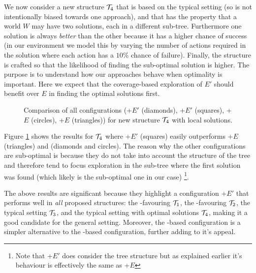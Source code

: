 We now consider a new structure ${\mathcal{T}}_4$ that is based on the typical setting (so is not intentionally biased towards one approach), and that has the property that a world $W$ may have two solutions, each in a different sub-tree. Furthermore one solution is always \textit{better} than the other because it has a higher chance of success (in our environment we model this by varying the number of actions required in the solution where each action has a $10\%$ chance of failure). Finally, the structure is crafted so that the likelihood of finding the sub-optimal solution is higher. The purpose is to understand how our approaches behave when optimality is important. Here we expect that the coverage-based exploration of $E'$ should benefit over $E$ in finding the optimal solutions first. 

\begin{figure}[ht]
\begin{center}

\end{center}
\caption{Comparison of all configurations (\BUL+$E'$ (diamonds), \CL+$E'$ (squares), \BUL+$E$ (circles), \CL+$E$ (triangles)) for new structure ${\mathcal{T}}_4$ with local solutions.}
\label{fig:T4_result}
\end{figure}

Figure \ref{fig:T4_result} shows the results for ${\mathcal{T}}_4$ where \CL+$E'$ (squares) easily outperforms \CL+$E$ (triangles) and \BUL (diamonds and circles). The reason why the other configurations are sub-optimal is because they do not take into account the structure of the tree and therefore tend to focus exploration in the sub-tree where the first solution was found (which likely is the sub-optimal one in our case) \footnote{Note that \BUL+$E'$ does consider the tree structure but as explained earlier it's behaviour is effectively the same as \BUL+$E$}.


The above results are significant because they highlight a configuration \CL+$E'$ that performs well in \textit{all} proposed structures: the \CL-favouring ${\mathcal{T}}_1$, the \BUL-favouring ${\mathcal{T}}_2$, the typical setting ${\mathcal{T}}_3$, and the typical setting with optimal solutions ${\mathcal{T}}_4$, making it a good candidate for the general setting. Moreover, the \CL-based configuration is a simpler alternative to the \BUL-based configuration, further adding to it's appeal.

